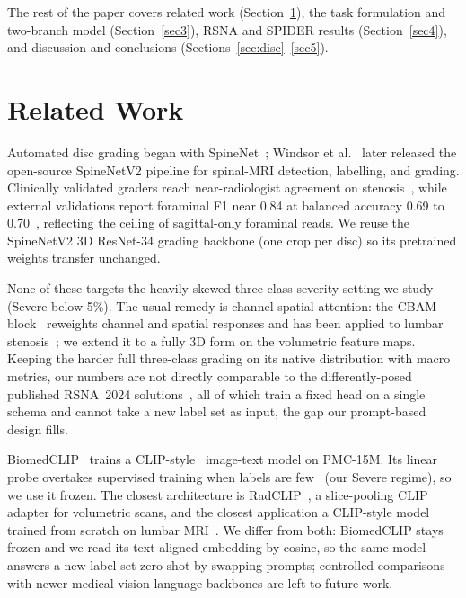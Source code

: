 \documentclass[runningheads]{llncs}
\begin{document}
The rest of the paper covers related work (Section~\ref{sec2}), the task formulation and two-branch model (Section~\ref{sec3}), RSNA and SPIDER results (Section~\ref{sec4}), and discussion and conclusions (Sections~\ref{sec:disc}--\ref{sec5}).

\section{Related Work}\label{sec2}

Automated disc grading began with SpineNet~\cite{jamaludin2017}; Windsor et al.~\cite{windsor2022} later released the open-source SpineNetV2 pipeline for spinal-MRI detection, labelling, and grading. Clinically validated graders reach near-radiologist agreement on stenosis~\cite{hallinan2021}, while external validations report foraminal F1 near 0.84 at balanced accuracy 0.69 to 0.70~\cite{mcsweeney2023,nigru2024}, reflecting the ceiling of sagittal-only foraminal reads. We reuse the SpineNetV2 3D ResNet-34 grading backbone (one crop per disc) so its pretrained weights transfer unchanged.

None of these targets the heavily skewed three-class severity setting we study (Severe below 5\%). The usual remedy is channel-spatial attention: the CBAM block~\cite{woo2018cbam} reweights channel and spatial responses and has been applied to lumbar stenosis~\cite{lin2024cbam}; we extend it to a fully 3D form on the volumetric feature maps. Keeping the harder full three-class grading on its native distribution with macro metrics, our numbers are not directly comparable to the differently-posed published RSNA~2024 solutions~\cite{aktan2025,kaggle2024,nshen2024}, all of which train a fixed head on a single schema and cannot take a new label set as input, the gap our prompt-based design fills.

BiomedCLIP~\cite{zhang2023biomedclip} trains a CLIP-style~\cite{radford2021clip} image-text model on PMC-15M. Its linear probe overtakes supervised training when labels are few~\cite{datascarcity2024} (our Severe regime), so we use it frozen. The closest architecture is RadCLIP~\cite{lu2024radclip}, a slice-pooling CLIP adapter for volumetric scans, and the closest application a CLIP-style model trained from scratch on lumbar MRI~\cite{le2025lumbarclip}. We differ from both: BiomedCLIP stays frozen and we read its text-aligned embedding by cosine, so the same model answers a new label set zero-shot by swapping prompts; controlled comparisons with newer medical vision-language backbones are left to future work.
\end{document}
